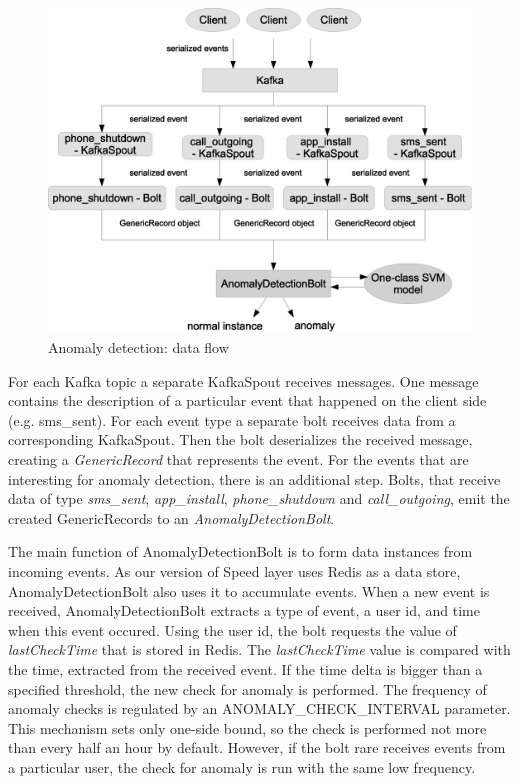 \begin{figure}[h]
  \centering
  \includegraphics [width=1.0\textwidth]{images/anomaly_detection_data_flow}
  \caption{Anomaly detection: data flow}
  \label{fig:anomaly_detection_data_flow}
\end{figure}

For each Kafka topic a separate KafkaSpout receives messages.
One message contains the description of a particular event that happened on the client side (e.g. sms\_sent).
For each event type a separate bolt receives data from a corresponding KafkaSpout.
Then the bolt deserializes the received message, creating a \textit{GenericRecord} that represents the event.
For the events that are interesting for anomaly detection, there is an additional step.
Bolts, that receive data of type \textit{sms\_sent}, \textit{app\_install}, \textit{phone\_shutdown} and \textit{call\_outgoing}, emit the created GenericRecords to an \textit{AnomalyDetectionBolt}.

The main function of AnomalyDetectionBolt is to form data instances from incoming events.
As our version of Speed layer uses Redis as a data store, AnomalyDetectionBolt also uses it to accumulate events.
When a new event is received, AnomalyDetectionBolt extracts a type of event, a user id, and time when this event occured.
Using the user id, the bolt requests the value of \textit{lastCheckTime} that is stored in Redis.
The \textit{lastCheckTime} value is compared with the time, extracted from the received event.
If the time delta is bigger than a specified threshold, the new check for anomaly is performed.
The frequency of anomaly checks is regulated by an ANOMALY\_CHECK\_INTERVAL parameter.
This mechanism sets only one-side bound, so the check is performed not more than every half an hour by default.
However, if the bolt rare receives events from a particular user, the check for anomaly is run with the same low frequency. 

